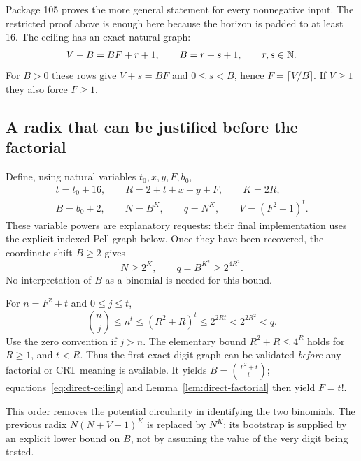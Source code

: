 Package 105 proves the more general statement for every nonnegative input.
The restricted proof above is enough here because the horizon is padded
to at least 16. The ceiling has an exact natural graph:
\begin{equation}\label{eq:direct-ceiling}
 V+B=BF+r+1,\qquad B=r+s+1,\qquad r,s\in\mathbb N.
\end{equation}
For $B>0$ these rows give $V+s=BF$ and $0\le s<B$, hence
$F=\lceil V/B\rceil$. If $V\ge1$ they also force $F\ge1$.

\subsection{A radix that can be justified before the factorial}

Define, using natural variables $t_0,x,y,F,b_0$,
\begin{equation}\label{eq:direct-radix}
 \begin{gathered}
 t=t_0+16,\qquad R=2+t+x+y+F,\qquad K=2R,\\
 B=b_0+2,\qquad N=B^K,\qquad q=N^K,\qquad V=(F^2+1)^t.
 \end{gathered}
\end{equation}
These variable powers are explanatory requests: their final implementation
uses the explicit indexed-Pell graph below. Once they have been recovered,
the coordinate shift $B\ge2$ gives
\begin{equation}\label{eq:direct-independent-radix}
 N\ge2^K,\qquad q=B^{K^2}\ge2^{4R^2}.
\end{equation}
No interpretation of $B$ as a binomial is needed for this bound.

For $n=F^2+t$ and $0\le j\le t$,
\begin{equation}\label{eq:direct-first-digit-bound}
 \binom nj\le n^t\le(R^2+R)^t
       \le2^{2Rt}<2^{2R^2}<q.
\end{equation}
Use the zero convention if $j>n$. The elementary bound $R^2+R\le4^R$
holds for $R\ge1$, and $t<R$. Thus the first exact digit graph can be
validated \emph{before} any factorial or CRT meaning is available. It yields
$B=\binom{F^2+t}{t}$; equations~\eqref{eq:direct-ceiling} and
Lemma~\ref{lem:direct-factorial} then yield $F=t!$.

This order removes the potential circularity in identifying the two
binomials. The previous radix $N(N+V+1)^K$ is replaced by $N^K$; its
bootstrap is supplied by an explicit lower bound on $B$, not by assuming
the value of the very digit being tested.

